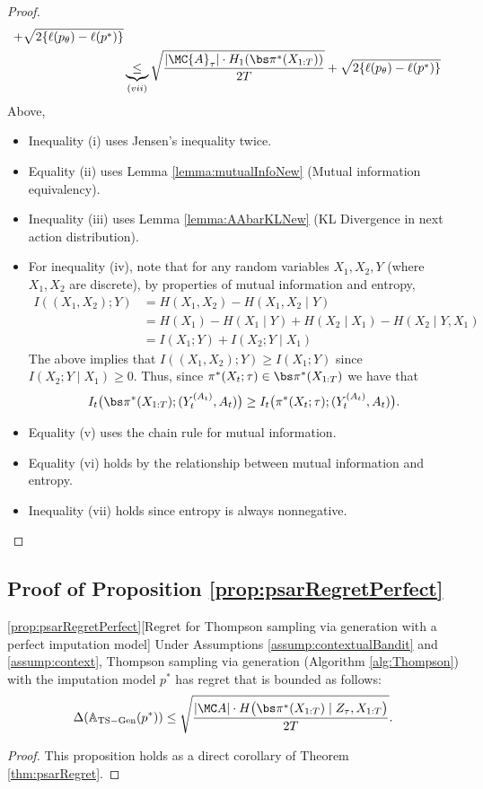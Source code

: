 \begin{proof}
\begin{align*}
    + \sqrt{ 2 \{ \ell(p_{\theta}) - \ell(p^*) \} } \\
    &\underbrace{\leq}_{(vii)} \sqrt{ \frac{|\MC{A}_{\tau}| \cdot H_1(\piX) }{2T} }
    + \sqrt{ 2 \{ \ell(p_{\theta}) - \ell(p^*) \} } \\
\end{align*}
Above, 
\begin{itemize}
    \item Inequality (i) uses Jensen's inequality twice.
    \item Equality (ii) uses Lemma \ref{lemma:mutualInfoNew} (Mutual information equivalency).
    \item Inequality (iii) uses Lemma \ref{lemma:AAbarKLNew} (KL Divergence in next action distribution).
    \item For inequality (iv), note that for any random variables $X_1, X_2, Y$ (where $X_1, X_2$ are discrete), by properties of mutual information and entropy,
    \begin{align*}
        I((X_1, X_2); Y) &= H(X_1, X_2) - H(X_1, X_2 \mid Y) \\
        &= H(X_1) - H(X_1 \mid Y) + H(X_2 \mid X_1) - H(X_2 \mid Y, X_1) \\
        &= I(X_1; Y) + I(X_2; Y \mid X_1)
    \end{align*}
    The above implies that $I((X_1, X_2); Y) \geq I(X_1; Y)$ since $I(X_2; Y \mid X_1) \geq 0$. Thus, since $\pi^*(X_t; \tau) \in \piX$ we have that
    \begin{align*}
        I_t \big( \piX; ( Y_t^{(A_t)}, A_t ) \big)
        \geq I_t\big ( \pi^*(X_t; \tau); ( Y_t^{(A_t)}, A_t ) \big).
    \end{align*}
    \item Equality (v) uses the chain rule for mutual information.
    \item Equality (vi) holds by the relationship between mutual information and entropy.
    \item Inequality (vii) holds since entropy is always nonnegative.
\end{itemize}
\end{proof}


\subsection{Proof of Proposition \ref{prop:psarRegretPerfect}}

\begin{customprop}{\ref{prop:psarRegretPerfect}}[Regret for Thompson sampling via generation with a perfect imputation model]
    Under Assumptions \ref{assump:contextualBandit} and \ref{assump:context}, Thompson sampling via generation (Algorithm \ref{alg:Thompson}) with the imputation model $p^*$ has regret that is bounded as follows:
    \begin{align*}
        \Delta( \mathbb{A}_{\rm{TS-Gen}}(p^*) ) \leq \sqrt{ \frac{ |\Aeval| \cdot H \big( \piX \mid Z_{\tau}, X_{1:T} \big) }{2 T} }.
    \end{align*}
\end{customprop}

\begin{proof}
This proposition holds as a direct corollary of Theorem \ref{thm:psarRegret}.
\end{proof}